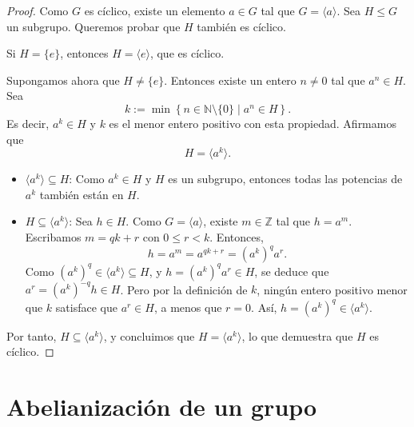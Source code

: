 \begin{proof}
	Como \( G \) es cíclico, existe un elemento \( a \in G \) tal que \( G = \langle a \rangle \). Sea \( H \leq G \) un subgrupo. Queremos probar que \( H \) también es cíclico.
	
	\medskip
	\noindent
	Si \( H = \{e\} \), entonces \( H = \langle e \rangle \), que es cíclico.
	
	\medskip
	\noindent
	Supongamos ahora que \( H \neq \{e\} \). Entonces existe un entero \( n \neq 0 \) tal que \( a^n \in H \). Sea
	\[
	k := \min \left\{ n \in \mathbb{N} \setminus \{0\} \mid a^n \in H \right\}.
	\]
	Es decir, \( a^k \in H \) y \( k \) es el menor entero positivo con esta propiedad. Afirmamos que
	\[
	H = \langle a^k \rangle.
	\]
	\begin{itemize}
		\item \( \langle a^k \rangle \subseteq H \): Como \( a^k \in H \) y \( H \) es un subgrupo, entonces todas las potencias de \( a^k \) también están en \( H \).
		
		\item  \( H \subseteq \langle a^k \rangle \): Sea \( h \in H \). Como \( G = \langle a \rangle \), existe \( m \in \mathbb{Z} \) tal que \( h = a^m \). Escribamos \( m = qk + r \) con \( 0 \leq r < k \). Entonces,
		\[
		h = a^m = a^{qk + r} = (a^k)^q a^r.
		\]
		Como \( (a^k)^q \in \langle a^k \rangle \subseteq H \), y \( h = (a^k)^q a^r \in H \), se deduce que \( a^r = (a^k)^{-q} h \in H \). Pero por la definición de \( k \), ningún entero positivo menor que \( k \) satisface que \( a^r \in H \), a menos que \( r = 0 \). Así, \( h = (a^k)^q \in \langle a^k \rangle \).
	\end{itemize}
	\medskip
	\noindent
	Por tanto, \( H \subseteq \langle a^k \rangle \), y concluimos que \( H = \langle a^k \rangle \), lo que demuestra que \( H \) es cíclico.
\end{proof}











\section{Abelianización de un grupo}\label{kjhgf}

\begin{definicion}
\end{definicion}

